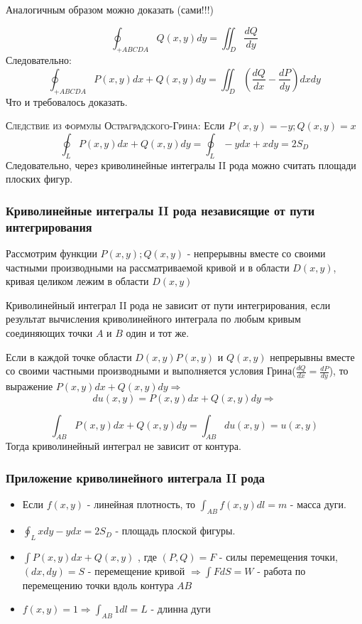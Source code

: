 \begin{definition}
    Аналогичным образом можно доказать (сами!!!) 

    $$
        \oint_{+ABCDA} Q(x,y) dy = \iint_D \frac{dQ}{dy}
    $$
    Следовательно: 
    $$
    \oint_{+ABCDA} P(x,y)dx + Q(x,y) dy = \iint_D (\frac{dQ}{dx} - \frac{dP}{dy})dxdy
    $$
    Что и требовалось доказать. 

    \textsc{Следствие из формулы Остраградского-Грина:} Если $P(x,y) = - y; Q(x,y) = x$
    $$
        \oint_{L} P(x,y) dx + Q(x,y) dy = \oint_L - ydx + xdy = 2S_D
    $$ Следовательно, через криволинейные интегралы II рода можно считать площади плоских фигур.
\end{definition}

\subsubsection{Криволинейные интегралы II рода независящие от пути интегрирования}

Рассмотрим функции $P(x,y); Q(x,y)$ - непрерывны вместе со своими частными производными на рассматриваемой кривой и в области $D(x,y)$, кривая целиком лежим в области $D(x,y)$

Криволинейный интеграл II рода не зависит от пути интегрирования, если результат вычисления криволинейного интеграла по любым кривым соединяющих точки $A$ и $B$ один и тот же. 


\begin{theorem}
    Если в каждой точке области $D(x,y) P(x,y) $ и $Q(x,y)$ непрерывны вместе со своими частными производными и выполняется условия Грина($\frac{dQ}{dx} = \frac{dP}{dy}$), то выражение $P(x,y) dx + Q(x,y) dy \Rightarrow$ $$ du(x,y) = P(x,y) dx + Q(x,y) dy \Rightarrow $$ 

    $$
        \int_{AB} P(x,y) dx + Q(x,y) dy= \int_{AB} du(x,y) = u(x,y)
    $$ Тогда криволинейный интеграл не зависит от контура. 
\end{theorem}

\subsubsection{Приложение криволинейного интеграла II рода}
\begin{itemize}
    \item Если $f(x,y)$ - линейная плотность, то $\int_{AB} f(x,y) dl = m$ - масса дуги. 
    \item $\oint_L x dy - y dx = 2S_D$ - площадь плоской фигуры. 
    \item $\int P(x,y) dx + Q(x,y)$ , где $(P, Q) = F$ - силы перемещения точки, $(dx, dy) = S$ - перемещение кривой $\Rightarrow \int F dS = W$ - работа по перемещению точки вдоль контура $AB$ 
    \item $f(x,y) = 1 \Rightarrow \int_{AB} 1 dl = L $ - длинна дуги
\end{itemize}

